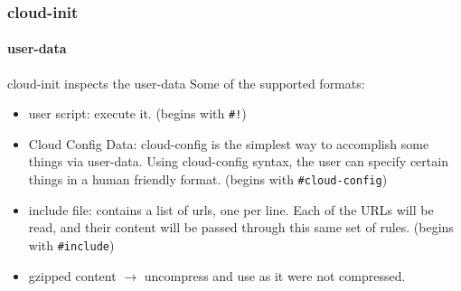 \begin{frame}
  \frametitle{cloud-init}
  \framesubtitle{user-data}

    \begin{block}{cloud-init inspects the user-data}
    Some of the supported formats:
    \begin{itemize}
      \item user script: execute it.  (begins with \texttt{\#!})
      \item Cloud Config Data: cloud-config is the simplest way to accomplish
      some things via user-data. Using cloud-config syntax, the user can
      specify certain things in a human friendly format. (begins with 
      \texttt{\#cloud-config})
      \item include file: contains a list
      of urls, one per line. Each of the URLs will be read, and their
      content will be passed through this same set of rules. (begins with 
      \texttt{\#include})
      \item gzipped content $\rightarrow$ uncompress and use as it were
         not compressed.
    \end{itemize}
    \end{block}
\end{frame}



